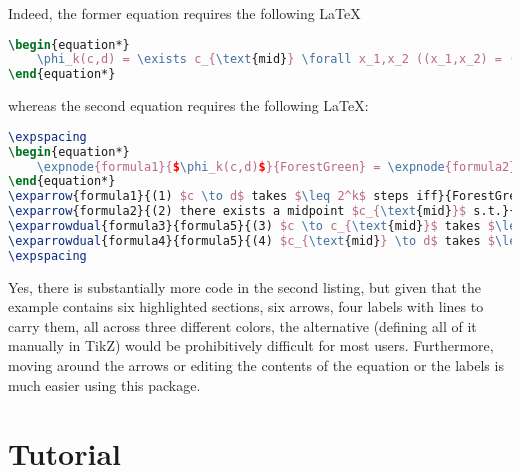 \documentclass{article} %
\begin{document}
Indeed, the former equation requires the following \LaTeX
\begin{lstlisting}[language=TeX, caption=\LaTeX \,\! for Equation Without Annotation]
\begin{equation*}
    \phi_k(c,d) = \exists c_{\text{mid}} \forall x_1,x_2 ((x_1,x_2) = (c,c_{\text{mid}}) \lor (x_1,x_2) = (c_{\text{mid}},d)) \Rightarrow \phi_{k-1}(x_1,x_2)].
\end{equation*}
\end{lstlisting}
whereas the second equation requires the following \LaTeX: 
\begin{lstlisting}[language=TeX, caption=\LaTeX \,\! for Equation With Annotation]
\expspacing
\begin{equation*}
    \expnode{formula1}{$\phi_k(c,d)$}{ForestGreen} = \expnode{formula2}{$\exists c_{\text{mid}}$}{blue} \forall x_1,x_2 [\expnode{formula3}{$((x_1,x_2) = (c,c_{\text{mid}})$}{red} \lor \expnode{formula4}{$(x_1,x_2) = (c_{\text{mid}},d))$}{red} \Rightarrow \expnode{formula5}{$\phi_{k-1}(x_1,x_2)$}{red}].
\end{equation*}
\exparrow{formula1}{(1) $c \to d$ takes $\leq 2^k$ steps iff}{ForestGreen}{dr}
\exparrow{formula2}{(2) there exists a midpoint $c_{\text{mid}}$ s.t.}{blue}{ur}
\exparrowdual{formula3}{formula5}{(3) $c \to c_{\text{mid}}$ takes $\leq 2^{k-1}$ steps and}{red}{d}
\exparrowdual{formula4}{formula5}{(4) $c_{\text{mid}} \to d$ takes $\leq 2^{k-1}$ steps.}{red}{u}
\expspacing
\end{lstlisting}
Yes, there is substantially more code in the second listing, but given that the example contains six highlighted sections, six arrows, four labels with lines to carry them, all across three different colors, the alternative (defining all of it manually in TikZ) would be prohibitively difficult for most users. Furthermore, moving around the arrows or editing the contents of the equation or the labels is much easier using this package. \newpage

\section{Tutorial}
\end{document}
